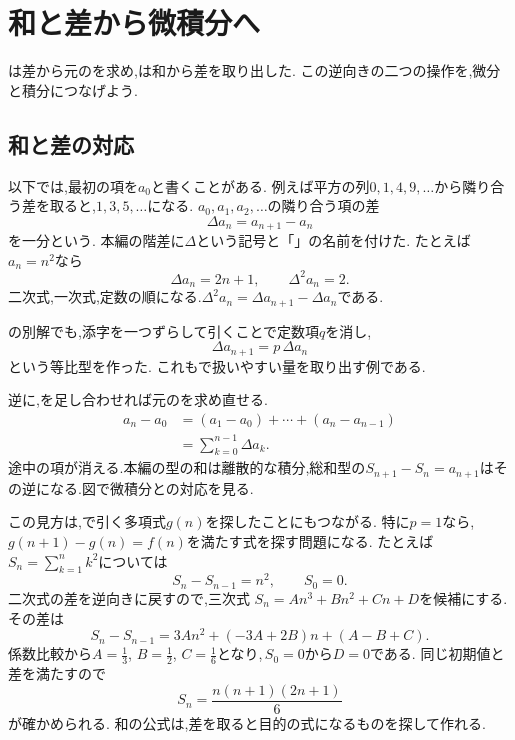 
\section{和と差から微積分へ}\label{節：差分から始まる離散的な微積分}

は差から元のを求め,は和から差を取り出した.
この逆向きの二つの操作を,微分と積分につなげよう.

\subsection{和と差の対応}
以下では,最初の項を$a_0$と書くことがある.
例えば平方の列$0,1,4,9,\ldots$から隣り合う差を取ると,$1,3,5,\ldots$になる.
$a_0,a_1,a_2,\ldots$の隣り合う項の差
\[
  \Delta a_n=a_{n+1}-a_n
\]
を一分という.
本編の階差に$\Delta$という記号と「」の名前を付けた.
たとえば$a_n=n^2$なら
\[
  \Delta a_n=2n+1,\qquad \Delta^2a_n=2.
\]
二次式,一次式,定数の順になる.$\Delta^2a_n=\Delta a_{n+1}-\Delta a_n$である.

の別解でも,添字を一つずらして引くことで定数項$q$を消し,
\[
  \Delta a_{n+1}=p\,\Delta a_n
\]
という等比型を作った.
これもで扱いやすい量を取り出す例である.

逆に,を足し合わせれば元のを求め直せる.
\[
  \begin{aligned}
    a_n-a_0
      &=(a_1-a_0)+\cdots+(a_n-a_{n-1})\\
      &=\sum_{k=0}^{n-1}\Delta a_k.
  \end{aligned}
\]
途中の項が消える.本編の型の和は離散的な積分,総和型の$S_{n+1}-S_n=a_{n+1}$はその逆になる.図で微積分との対応を見る.
  \BookFigDifference

この見方は,で引く多項式$g(n)$を探したことにもつながる.
特に$p=1$なら,\,$g(n+1)-g(n)=f(n)$を満たす式を探す問題になる.
たとえば$S_n=\sum_{k=1}^n k^2$については
\[
  S_n-S_{n-1}=n^2,\qquad S_0=0.
\]
二次式の差を逆向きに戻すので,三次式
$S_n=An^3+Bn^2+Cn+D$を候補にする.
その差は
\[
  S_n-S_{n-1}
  =3An^2+(-3A+2B)n+(A-B+C).
\]
係数比較から$\displaystyle A=\frac{1}{3}$, $\displaystyle B=\frac{1}{2}$, $\displaystyle C=\frac{1}{6}$となり,\,$S_0=0$から$D=0$である.
同じ初期値と差を満たすので
\[
  S_n=\frac{n(n+1)(2n+1)}6
\]
が確かめられる.
和の公式は,差を取ると目的の式になるものを探して作れる.

